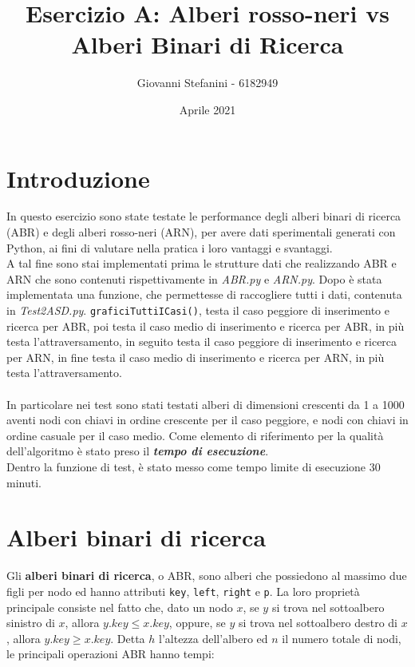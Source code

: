 \documentclass[]{article}
\def\code#1{\texttt{#1}} %
\begin{document}
\title{Esercizio A: Alberi rosso-neri vs Alberi Binari di Ricerca}
\author{Giovanni Stefanini - 6182949}
\date{Aprile 2021}
\maketitle

\section {Introduzione}
In questo esercizio sono state testate le performance degli alberi binari di ricerca (ABR) e degli alberi rosso-neri (ARN), per avere dati sperimentali generati con Python, ai fini di valutare nella pratica i loro vantaggi e svantaggi. \\
A tal fine sono stai implementati prima le strutture dati che realizzando ABR e ARN che sono contenuti rispettivamente in {\em ABR.py} e {\em ARN.py}. Dopo è stata implementata una funzione, che permettesse di raccogliere tutti i dati, contenuta in {\em Test2ASD.py}. \code{graficiTuttiICasi()}, testa il caso peggiore di inserimento e ricerca per ABR, poi testa il caso medio di inserimento e ricerca per ABR, in più testa l'attraversamento, in seguito testa il caso peggiore di inserimento e ricerca per ARN, in fine testa il caso medio di inserimento e ricerca per ARN, in più testa l'attraversamento.\\
\\
In particolare nei test sono stati testati alberi di dimensioni crescenti da 1 a 1000 aventi nodi con chiavi in ordine crescente per il caso peggiore, e nodi con chiavi in ordine casuale per il caso medio. 
Come elemento di riferimento per la qualità dell'algoritmo è stato preso il {\em \bf tempo di esecuzione}. \\
Dentro la funzione di test, è stato messo come tempo limite di esecuzione 30 minuti.


\section {Alberi binari di ricerca}
Gli {\bf alberi binari di ricerca}, o ABR, sono alberi che possiedono al massimo due figli per nodo ed hanno attributi \code{key}, \code{left}, \code{right} e \code{p}. La loro proprietà principale consiste nel fatto che, dato un nodo $x$, se $y$ si trova nel sottoalbero sinistro di $x$, allora $y.key \leq x.key$, oppure, se $y$ si trova nel sottoalbero destro di $x$, allora $y.key \geq x.key$. Detta $h$ l'altezza dell'albero ed $n$ il numero totale di nodi, le principali operazioni ABR hanno tempi:\\
\end{document}
